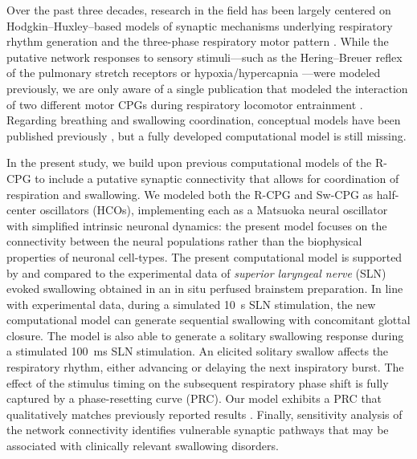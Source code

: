 \documentclass[pdflatex,sn-mathphys-ay]{sn-jnl}%
\theoremstyle{thmstyleone}%
\theoremstyle{thmstyletwo}%
\theoremstyle{thmstylethree}%
\begin{document}
Over the past three decades, research in the field has been largely centered on Hodgkin–Huxley–based models of synaptic mechanisms underlying respiratory rhythm generation and the three-phase respiratory motor pattern \citep{rybak1997modeling, rybak2004modeling, smith2007spatial, rubin2009multiple, molkov2013control, molkov2014closed, molkov2017computational, lindsey2012computational}. While the putative network responses to sensory stimuli---such as the Hering--Breuer reflex of the pulmonary stretch receptors \citep{molkov2013control} or hypoxia/hypercapnia \citep{molkov2014closed}---were modeled previously, we are only aware of a single publication that modeled the interaction of two different motor CPGs during respiratory locomotor entrainment \citep{potts2005respiratory}. Regarding breathing and swallowing coordination, conceptual models have been published previously \citep{bolser2013central, pitts2013coordination}, but a fully developed computational model is still missing. 

In the present study, we build upon previous computational models of the R-CPG \citep{smith1991pre, rybak2004modeling, rubin2009multiple} to include a putative synaptic connectivity that allows for coordination of respiration and swallowing. We modeled both the R-CPG and Sw-CPG as half-center oscillators (HCOs), implementing each as a Matsuoka neural oscillator \citep{matsuoka2011analysis} with simplified intrinsic neuronal dynamics: the present model focuses on the connectivity between the neural populations rather than the biophysical properties of neuronal cell-types. The present computational model is supported by and compared to the experimental data of \textit{superior laryngeal nerve} (SLN) evoked swallowing obtained in an in situ perfused brainstem preparation. In line with experimental data, during a simulated 10~s SLN stimulation, the new computational model can generate sequential swallowing with concomitant glottal closure. The model is also able to generate a solitary swallowing response during a stimulated 100~ms SLN stimulation. An elicited solitary swallow affects the respiratory rhythm, either advancing or delaying the next inspiratory burst. The effect of the stimulus timing on the subsequent respiratory phase shift is fully captured by a phase-resetting curve (PRC). Our model exhibits a PRC that qualitatively matches previously reported results \citep{oku1992phase}. Finally, sensitivity analysis of the network connectivity identifies vulnerable synaptic pathways that may be associated with clinically relevant swallowing disorders.
\end{document}
